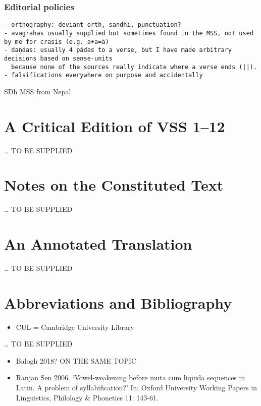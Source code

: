\documentclass[]{article}
\providecommand{\tightlist}{%
  \setlength{\itemsep}{0pt}\setlength{\parskip}{0pt}}
\begin{document}
\hypertarget{editorial-policies}{%
\subsubsection{Editorial policies}\label{editorial-policies}}

\begin{verbatim}
- orthography: deviant orth, sandhi, punctuation?
- avagrahas usually supplied but sometimes found in the MSS, not used by me for crasis (e.g. a+a=ā)
- daṇḍas: usually 4 pādas to a verse, but I have made arbitrary decisions based on sense-units 
  because none of the sources really indicate where a verse ends (||).
- falsifications everywhere on purpose and accidentally
\end{verbatim}

SDh MSS from Nepal

\hypertarget{a-critical-edition-of-vss-112}{%
\section{A Critical Edition of VSS
1--12}\label{a-critical-edition-of-vss-112}}

\ldots{} TO BE SUPPLIED

\hypertarget{notes-on-the-constituted-text}{%
\section{Notes on the Constituted
Text}\label{notes-on-the-constituted-text}}

\ldots{} TO BE SUPPLIED

\hypertarget{an-annotated-translation}{%
\section{An Annotated Translation}\label{an-annotated-translation}}

\ldots{} TO BE SUPPLIED

\hypertarget{abbreviations-and-bibliography}{%
\section{Abbreviations and
Bibliography}\label{abbreviations-and-bibliography}}

\begin{itemize}
\tightlist
\item
  CUL = Cambridge University Library 
\end{itemize}

\ldots{} TO BE SUPPLIED

\begin{itemize}
\item
  Balogh 2018? ON THE SAME TOPIC
\item
  Ranjan Sen 2006. `Vowel-weakening before muta cum liquidā sequences in
  Latin. A problem of syllabification?' In: Oxford University Working
  Papers in Linguistics, Philology \& Phonetics 11: 143-61.
\end{itemize}
\end{document}
